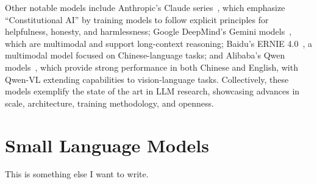 Other notable models include Anthropic's Claude series~\citep{anthropic2024claude3,anthropic2024claude35,anthropic2025claude37}, which emphasize “Constitutional AI” by training models to follow explicit principles for helpfulness, honesty, and harmlessness; Google DeepMind's Gemini models~\citep{deepmind2023gemini}, which are multimodal and support long-context reasoning; Baidu's ERNIE 4.0~\citep{baidu2023ernie4}, a multimodal model focused on Chinese-language tasks; and Alibaba's Qwen models~\citep{alibaba2023qwen}, which provide strong performance in both Chinese and English, with Qwen-VL extending capabilities to vision-language tasks. Collectively, these models exemplify the state of the art in LLM research, showcasing advances in scale, architecture, training methodology, and openness.



\section{Small Language Models}

This is something else I want to write.






